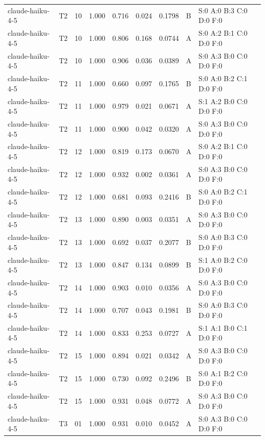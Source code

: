 \begin{longtable}{llrrrrrll}
claude-haiku-4-5 & T2 & 10 & 1.000 & 0.716 & 0.024 & 0.1798 & B & \tiny S:0 A:0 B:3 C:0 D:0 F:0 \\
claude-haiku-4-5 & T2 & 10 & 1.000 & 0.806 & 0.168 & 0.0744 & A & \tiny S:0 A:2 B:1 C:0 D:0 F:0 \\
claude-haiku-4-5 & T2 & 10 & 1.000 & 0.906 & 0.036 & 0.0389 & A & \tiny S:0 A:3 B:0 C:0 D:0 F:0 \\
claude-haiku-4-5 & T2 & 11 & 1.000 & 0.660 & 0.097 & 0.1765 & B & \tiny S:0 A:0 B:2 C:1 D:0 F:0 \\
claude-haiku-4-5 & T2 & 11 & 1.000 & 0.979 & 0.021 & 0.0671 & A & \tiny S:1 A:2 B:0 C:0 D:0 F:0 \\
claude-haiku-4-5 & T2 & 11 & 1.000 & 0.900 & 0.042 & 0.0320 & A & \tiny S:0 A:3 B:0 C:0 D:0 F:0 \\
claude-haiku-4-5 & T2 & 12 & 1.000 & 0.819 & 0.173 & 0.0670 & A & \tiny S:0 A:2 B:1 C:0 D:0 F:0 \\
claude-haiku-4-5 & T2 & 12 & 1.000 & 0.932 & 0.002 & 0.0361 & A & \tiny S:0 A:3 B:0 C:0 D:0 F:0 \\
claude-haiku-4-5 & T2 & 12 & 1.000 & 0.681 & 0.093 & 0.2416 & B & \tiny S:0 A:0 B:2 C:1 D:0 F:0 \\
claude-haiku-4-5 & T2 & 13 & 1.000 & 0.890 & 0.003 & 0.0351 & A & \tiny S:0 A:3 B:0 C:0 D:0 F:0 \\
claude-haiku-4-5 & T2 & 13 & 1.000 & 0.692 & 0.037 & 0.2077 & B & \tiny S:0 A:0 B:3 C:0 D:0 F:0 \\
claude-haiku-4-5 & T2 & 13 & 1.000 & 0.847 & 0.134 & 0.0899 & B & \tiny S:1 A:0 B:2 C:0 D:0 F:0 \\
claude-haiku-4-5 & T2 & 14 & 1.000 & 0.903 & 0.010 & 0.0356 & A & \tiny S:0 A:3 B:0 C:0 D:0 F:0 \\
claude-haiku-4-5 & T2 & 14 & 1.000 & 0.707 & 0.043 & 0.1981 & B & \tiny S:0 A:0 B:3 C:0 D:0 F:0 \\
claude-haiku-4-5 & T2 & 14 & 1.000 & 0.833 & 0.253 & 0.0727 & A & \tiny S:1 A:1 B:0 C:1 D:0 F:0 \\
claude-haiku-4-5 & T2 & 15 & 1.000 & 0.894 & 0.021 & 0.0342 & A & \tiny S:0 A:3 B:0 C:0 D:0 F:0 \\
claude-haiku-4-5 & T2 & 15 & 1.000 & 0.730 & 0.092 & 0.2496 & B & \tiny S:0 A:1 B:2 C:0 D:0 F:0 \\
claude-haiku-4-5 & T2 & 15 & 1.000 & 0.931 & 0.048 & 0.0772 & A & \tiny S:0 A:3 B:0 C:0 D:0 F:0 \\
claude-haiku-4-5 & T3 & 01 & 1.000 & 0.931 & 0.010 & 0.0452 & A & \tiny S:0 A:3 B:0 C:0 D:0 F:0 \\

\end{longtable}
